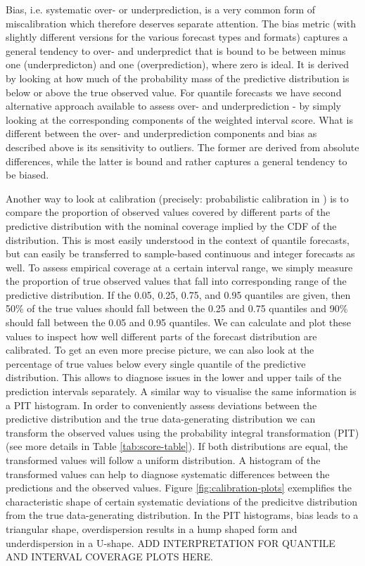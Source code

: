 \documentclass[article,shortnames]{jss}
\begin{document}
Bias, i.e. systematic over- or underprediction, is a very common form of miscalibration which therefore deserves separate attention. The bias metric (with slightly different versions for the various forecast types and formats) captures a general tendency to over- and underpredict that is bound to be between minus one (underpredicton) and one (overprediction), where zero is ideal. It is derived by looking at how much of the probability mass of the predictive distribution is below or above the true observed value. For quantile forecasts we have second alternative approach available to assess over- and underprediction - by simply looking at the corresponding components of the weighted interval score. What is different between the over- and underprediction components and bias as described above is its sensitivity to outliers. The former are derived from absolute differences, while the latter is bound and rather captures a general tendency to be biased. 

Another way to look at calibration (precisely: probabilistic calibration in \cite{gneitingProbabilisticForecastsCalibration2007}) is to compare the proportion of observed values covered by different parts of the predictive distribution with the nominal coverage implied by the CDF of the distribution. This is most easily understood in the context of quantile forecasts, but can easily be transferred to sample-based continuous and integer forecasts as well. 
%
To assess empirical coverage at a certain interval range, we simply measure the proportion of true observed values that fall into corresponding range of the predictive distribution. If the 0.05, 0.25, 0.75, and 0.95 quantiles are given, then 50\% of the true values should fall between the 0.25 and 0.75 quantiles and 90\% should fall between the 0.05 and 0.95 quantiles. We can calculate and plot these values to inspect how well different parts of the forecast distribution are calibrated. 
%
To get an even more precise picture, we can also look at the percentage of true values below every single quantile of the predictive distribution. This allows to diagnose issues in the lower and upper tails of the prediction intervals separately. A similar way to visualise the same information is a PIT histogram. In order to conveniently assess deviations between the predictive distribution and the true data-generating distribution we can transform the observed values using the probability integral transformation (PIT) \citep{dawidPresentPositionPotential1984} (see more details in Table \ref{tab:score-table}). If both distributions are equal, the transformed values will follow a uniform distribution. A histogram of the transformed values can help to diagnose systematic differences between the predictions and the observed values. Figure \ref{fig:calibration-plots} exemplifies the characteristic shape of certain systematic deviations of the predicitve distribution from the true data-generating distribution. In the PIT histograms, bias leads to a triangular shape, overdispersion results in a hump shaped form and underdispersion in a U-shape. ADD INTERPRETATION FOR QUANTILE AND INTERVAL COVERAGE PLOTS HERE. 
\end{document}
